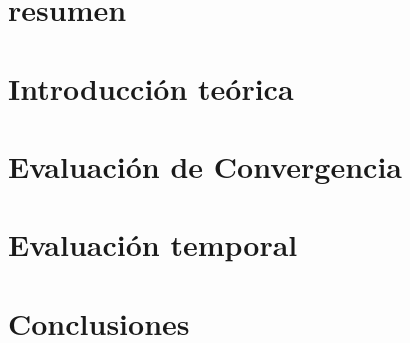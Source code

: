 


 



\section*{resumen}


\vspace{2em}
\tableofcontents
\newpage

\section{Introducción teórica}

\newpage

%

\section{Evaluación de Convergencia}

\newpage

\section{Evaluación temporal}

\newpage

\section{Conclusiones}

\newpage

%

%
%


